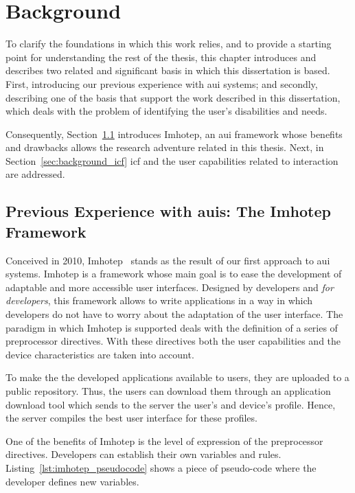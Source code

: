 \section{Background}
\label{sec:background}

To clarify the foundations in which this work relies, and to provide a starting 
point for understanding the rest of the thesis, this chapter introduces and 
describes two related and significant basis in which this dissertation is based. 
First, introducing our previous experience with \ac{aui} systems; and secondly, 
describing one of the basis that support the work described in this dissertation, 
which deals with the problem of identifying the user's disabilities and needs.

Consequently, Section~\ref{sec:background_imhotep} introduces Imhotep, an \ac{aui}
framework whose benefits and drawbacks allows the research adventure related
in this thesis. Next, in Section~\ref{sec:background_icf} \ac{icf} and
the user capabilities related to interaction are addressed.

\subsection{Previous Experience with \acp{aui}: The Imhotep Framework}
\label{sec:background_imhotep}

Conceived in 2010, Imhotep~\citep{almeida_imhotep_2011} stands as the result of 
our first approach to \ac{aui} systems. Imhotep is a framework whose main goal
is to ease the development of adaptable and more accessible user interfaces. 
Designed by developers and \textit{for developers}, this framework allows to 
write applications in a way in which developers do not have to worry about the 
adaptation of the user interface. The paradigm in which Imhotep is supported 
deals with the definition of a series of preprocessor directives. With these 
directives both the user capabilities and the device characteristics are taken
into account. 

To make the the developed applications available to users, they are uploaded to 
a public repository. Thus, the users can download them through an application 
download tool which sends to the server the user's and device's profile. Hence, 
the server compiles the best user interface for these profiles.

One of the benefits of Imhotep is the level of expression of the preprocessor
directives. Developers can establish their own variables and rules.
Listing~\ref{lst:imhotep_pseudocode} shows a piece of pseudo-code where the
developer defines new variables.

